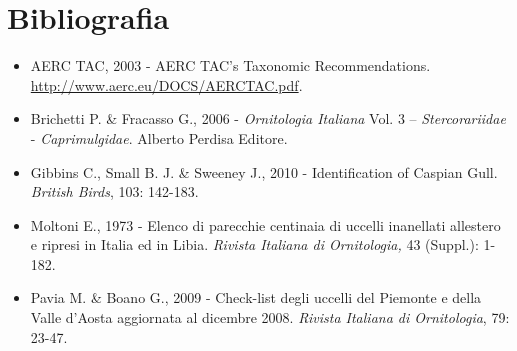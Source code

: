 \section*{Bibliografia}
\begin{itemize}\itemsep0pt
	\item AERC TAC, 2003 - AERC TAC{\textquoteright}s Taxonomic Recommendations. \\
	\url{http://www.aerc.eu/DOCS/AERCTAC.pdf}. 

	\item Brichetti P. \& Fracasso G., 2006 - \textit{Ornitologia Italiana} Vol. 3
-- \textit{Stercorariidae} - \textit{Caprimulgidae}. Alberto Perdisa Editore.

	\item Gibbins C., Small B. J. \& Sweeney J., 2010 - Identification of Caspian
Gull. \textit{British Birds}, 103: 142-183. 

	\item Moltoni E., 1973 - Elenco di parecchie centinaia di uccelli inanellati
all{\textquotesingle}estero e ripresi in Italia ed in Libia.
\textit{Rivista Italiana di Ornitologia, }43 (Suppl.): 1-182. 

	\item Pavia M. \& Boano G., 2009 - Check-list degli uccelli del Piemonte e
della Valle d{\textquoteright}Aosta aggiornata al dicembre 2008.
\textit{Rivista Italiana di Ornitologia}, 79: 23-47. 
\end{itemize}
